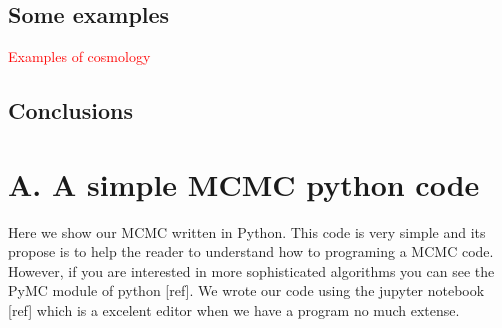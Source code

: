 \documentclass[onecolumn,           %
               showpacs,            %
               preprintnumbers,     %
               aps,                 %
               prl,          	    %
               letterpaper,             %
               superscriptaddress,      %
               nofootinbib,         %
               tightenlines,        %
               floats,floatfix      %
               ,usenatbib,
               ]{revtex4-1}
\begin{document}
\subsection{Some examples}
\textcolor{red}{Examples of cosmology}
\subsection{Conclusions}
\appendix
\section{A. A simple MCMC python code}

Here we show our MCMC written in Python. This code is very simple and its propose is to help the reader to understand how to programing a MCMC code. However, if you are interested in more sophisticated algorithms you can see the PyMC module of python [ref]. We wrote our code using the jupyter notebook [ref] which is a excelent editor when we have a program no much extense.  
\end{document}
